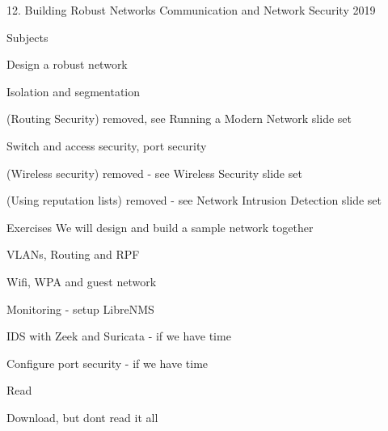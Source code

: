 \documentclass[Screen16to9,17pt]{foils}
\begin{document}
\mytitlepage
{12. Building Robust Networks}
{Communication and Network Security 2019}



\begin{list1}
\item Subjects
\begin{list2}
\item Design a robust network
\item Isolation and segmentation
\item (Routing Security) removed, see Running a Modern Network slide set
\item Switch and access security, port security
\item (Wireless security) removed - see Wireless Security slide set
\item (Using reputation lists) removed - see Network Intrusion Detection slide set
\end{list2}
\item Exercises We will design and build a sample network together
\begin{list2}
\item VLANs, Routing and RPF
\item Wifi, WPA and guest network
\item Monitoring - setup LibreNMS
\item IDS with Zeek and Suricata - if we have time
\item Configure port security - if we have time
\end{list2}
\end{list1}



\begin{list2}
\item Read
\item {\small {}}
\item {\small {}}
\item Download, but dont read it all\\{\small {}}
\end{list2}
\end{document}
